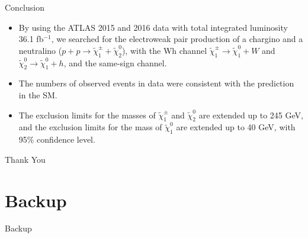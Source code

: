 \documentclass[mathserif,serif]{beamer}
\begin{document}
\begin{frame}{Conclusion}
\begin{itemize}
\item By using the ATLAS 2015 and 2016 data with total integrated luminosity 36.1 fb$^{-1}$, we searched for the electroweak pair production of a chargino and a neutralino
($p + p \rightarrow \tilde{\chi}_1^\pm + \tilde{\chi}_2^0$), with the Wh channel $\tilde{\chi}_1^\pm \rightarrow \tilde{\chi}_1^0 + W$ and $\tilde{\chi}_2^0 \rightarrow \tilde{\chi}_1^0 + h$, and the same-sign channel.
\item The numbers of observed events in data were consistent with the prediction in the SM.
\item The exclusion limits for the masses of $\tilde{\chi}_1^\pm$ and $\tilde{\chi}_2^0$ are extended up to 245 GeV, and the exclusion limits for the mass of $\tilde{\chi}_1^0$ are extended up to 40 GeV, with 95\% confidence level.
\end{itemize}
\end{frame}

\begin{frame}
\begin{center}
\huge
Thank You
\end{center}
\end{frame}

\section{Backup}
\begin{frame}
\begin{center}
\huge
Backup
\end{center}
\end{frame}
\end{document}
